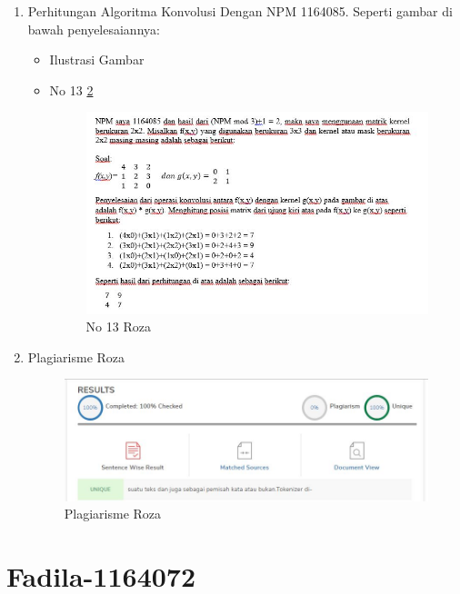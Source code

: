 \begin{enumerate}
\item Perhitungan Algoritma Konvolusi Dengan NPM 1164085. Seperti gambar di bawah penyelesaiannya:
\begin{itemize}
\item Ilustrasi Gambar
\item No 13 \ref{teori13}
\begin{figure}[!hbtp]
\centering
\includegraphics[scale=0.6]{figures/teori13.jpg}
\caption{No 13 Roza}
\label{teori13}
\end{figure}
\par
\end{itemize}
\par
\par
\item Plagiarisme Roza
\begin{figure}[!hbtp]
\centering
\includegraphics[scale=0.6]{figures/plagairismerozac7.jpg}
\caption{Plagiarisme Roza}
\label{teori13}
\end{figure}
\par
\end{enumerate}
\par
\par








\section{Fadila-1164072}
